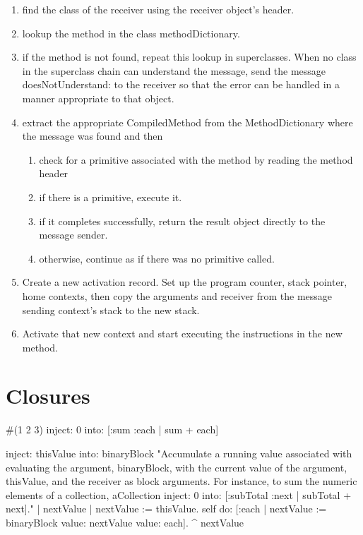 \documentclass[a4paper,10pt,twoside]{book}
\begin{document}
\begin{enumerate}
\item find the class of the receiver using the receiver object's header.
\item lookup the method in the class methodDictionary.
\item if the method is not found, repeat this lookup in superclasses.
When no class in the superclass chain can understand the message, send the message doesNotUnderstand: to the receiver so that the error can be handled in a manner appropriate to that object.

\item extract the appropriate CompiledMethod from the MethodDictionary where the message was found and then 
\begin{enumerate}
\item check for a primitive associated with the method by reading the method header
\item if there is a primitive, execute it.
\item if it completes successfully, return the result object directly to the message sender.
\item otherwise, continue as if there was no primitive called.
\end{enumerate}
\item Create a new activation record. Set up the program counter, stack pointer,
home contexts, then copy the arguments and receiver from the message sending context's stack to the new stack.

\item Activate that new context and start executing the instructions in the new method.
\end{enumerate}


\section{Closures}


\begin{code}{}
#(1 2 3) inject: 0 into: [:sum :each | sum + each]
\end{code}

\begin{code}{}
inject: thisValue into: binaryBlock
	"Accumulate a running value associated with evaluating the argument, 	
	binaryBlock, with the current value of the argument, thisValue, and the 
	receiver as block arguments. For instance, to sum the numeric elements of a 
	collection, aCollection inject: 0 into: [:subTotal :next | subTotal + next]."
	| nextValue |
	nextValue := thisValue.
	self do: [:each | nextValue := binaryBlock value: nextValue value: each]. 	^ nextValue
\end{code}
\end{document}
